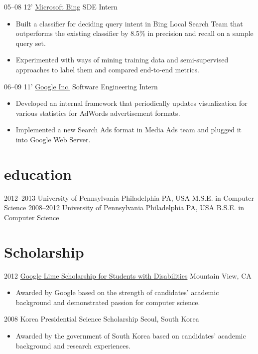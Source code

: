 \documentclass[]{patyoon-cv}
\begin{document}
\begin{entrylist}
{\begin{itemize}
    \end{itemize}
  }
  \entry
  {05–08 12'}
  {\href{http://bing.com/}{Microsoft Bing}}
  {SDE Intern}
  {\begin{itemize}
    \item Built a classifier for deciding query intent in Bing Local Search Team that outperforms the existing classifier by 8.5\% in precision and recall on a sample query set.
    \item Experimented with ways of mining training data and semi-supervised approaches to label them and compared end-to-end metrics.
    \end{itemize}}
  \entry
  {06–09 11'}
  {\href{http://www.google.com}{Google Inc.}}
  {Software Engineering Intern}
  {\begin{itemize}
    \item Developed an internal framework that periodically updates visualization for various statistics for AdWords advertisement formats.
    \item Implemented a new Search Ads format in Media Ads team and plugged it into Google Web Server.
    \end{itemize}}
\end{entrylist}

\section{education}

\begin{entrylist}
  \entry
  {2012–2013}
  {University of Pennsylvania}
  {Philadelphia PA, USA}
  {M.S.E. in Computer Science}
  \entry
  {2008–2012}
  {University of Pennsylvania}
  {Philadelphia PA, USA}
  {B.S.E. in Computer Science}
\end{entrylist}

\section{Scholarship}

\begin{entrylist}
  \entry
  {2012} {\href{http://www.limeconnect.com/opportunities/page/google-lime-scholarship-program}
    {Google Lime Scholarship for Students with Disabilities}}
  {Mountain View, CA}
  {\begin{itemize}
    \item Awarded by Google based on the strength of candidates' academic background and demonstrated passion for computer science.
    \end{itemize}
  }
  \entry
  {2008}
  {Korea Presidential Science Scholarship}
  {Seoul, South Korea}
  {\begin{itemize}
    \item Awarded by the government of South Korea based on candidates' academic background and research experiences.
    \end{itemize}
  }
\end{entrylist}
\end{document}

